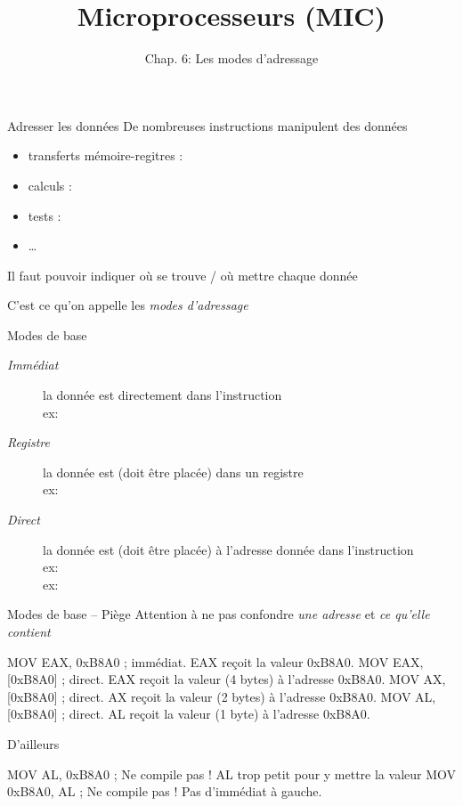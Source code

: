 \documentclass[14pt]{beamer}
\title{Microprocesseurs (MIC)}
\subtitle{Chap. 6: Les modes d'adressage}
\date{}
\begin{document}
\begin{frame}
\titlepage
\end{frame}

\begin{frame}[fragile]{Adresser les données}
De nombreuses instructions manipulent des données
	\begin{itemize}
	\item transferts mémoire-regitres : 
	\item calculs : 
	\item tests : 
	\item \dots
	\end{itemize}

\medskip
Il faut pouvoir indiquer où se trouve / où mettre chaque donnée

\medskip
C'est ce qu'on appelle les \emph{modes d'adressage}
\end{frame}

\begin{frame}[fragile]{Modes de base}
\begin{description}
  \item[\emph{Immédiat}] 
	la donnée est directement dans l'instruction
	\\ex:  
  \item[\emph{Registre}] la donnée est (doit être placée) dans un registre
	\\ex:  \asm{,} 
  \item[\emph{Direct}] la donnée est (doit être placée) à l'adresse donnée dans l'instruction
	\\ex:  \fbox{\asm{[0xB8A0]}}
	\\ex:  \fbox{\asm{[0xB8A2]}}
\end{description}
\end{frame}

\begin{frame}[fragile]{Modes de base -- Piège}
Attention à ne pas confondre \emph{une adresse} et \emph{ce qu'elle contient}
\begin{Asm}
	MOV EAX, 0xB8A0      ; immédiat. EAX reçoit la valeur 0xB8A0.
	MOV EAX, [0xB8A0]    ; direct. EAX reçoit la valeur (4 bytes) à l'adresse 0xB8A0.
	MOV AX, [0xB8A0]     ; direct. AX reçoit la valeur (2 bytes) à l'adresse 0xB8A0.
	MOV AL, [0xB8A0]     ; direct. AL reçoit la valeur (1 byte) à l'adresse 0xB8A0.
\end{Asm}
\bigskip
D'ailleurs
\begin{Asm}
	MOV AL, 0xB8A0      ; Ne compile pas ! AL trop petit pour y mettre la valeur
	MOV 0xB8A0, AL      ; Ne compile pas ! Pas d'immédiat à gauche.
\end{Asm}
\end{frame}
\end{document}
